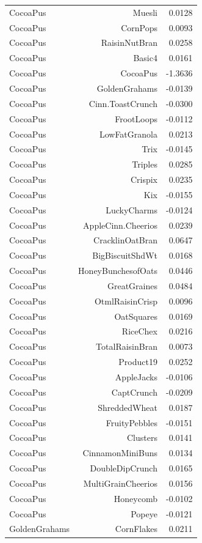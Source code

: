 \begin{longtable}{@{}lrr@{}}
CocoaPus & Muesli & 0.0128 \\
CocoaPus & CornPops & 0.0093 \\
CocoaPus & RaisinNutBran & 0.0258 \\
CocoaPus & Basic4 & 0.0161 \\
CocoaPus & CocoaPus & -1.3636 \\
CocoaPus & GoldenGrahams & -0.0139 \\
CocoaPus & Cinn.ToastCrunch & -0.0300 \\
CocoaPus & FrootLoops & -0.0112 \\
CocoaPus & LowFatGranola & 0.0213 \\
CocoaPus & Trix & -0.0145 \\
CocoaPus & Triples & 0.0285 \\
CocoaPus & Crispix & 0.0235 \\
CocoaPus & Kix & -0.0155 \\
CocoaPus & LuckyCharms & -0.0124 \\
CocoaPus & AppleCinn.Cheerios & 0.0239 \\
CocoaPus & CracklinOatBran & 0.0647 \\
CocoaPus & BigBiscuitShdWt & 0.0168 \\
CocoaPus & HoneyBunchesofOats & 0.0446 \\
CocoaPus & GreatGraines & 0.0484 \\
CocoaPus & OtmlRaisinCrisp & 0.0096 \\
CocoaPus & OatSquares & 0.0169 \\
CocoaPus & RiceChex & 0.0216 \\
CocoaPus & TotalRaisinBran & 0.0073 \\
CocoaPus & Product19 & 0.0252 \\
CocoaPus & AppleJacks & -0.0106 \\
CocoaPus & CaptCrunch & -0.0209 \\
CocoaPus & ShreddedWheat & 0.0187 \\
CocoaPus & FruityPebbles & -0.0151 \\
CocoaPus & Clusters & 0.0141 \\
CocoaPus & CinnamonMiniBuns & 0.0134 \\
CocoaPus & DoubleDipCrunch & 0.0165 \\
CocoaPus & MultiGrainCheerios & 0.0156 \\
CocoaPus & Honeycomb & -0.0102 \\
CocoaPus & Popeye & -0.0121 \\
GoldenGrahams & CornFlakes & 0.0211 \\

\end{longtable}
